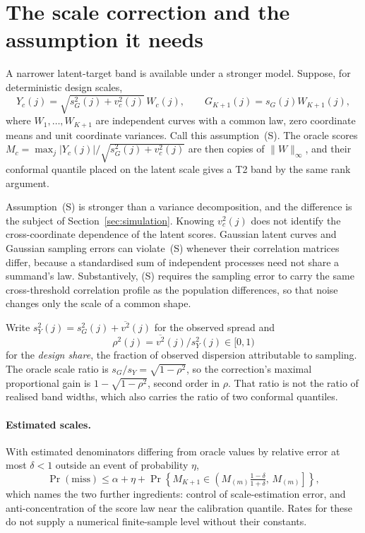 \section{The scale correction and the assumption it needs}\label{sec:correction}

A narrower latent-target band is available under a stronger model. Suppose,
for deterministic design scales,
\begin{equation}\label{eq:shape}
Y_c(j)=\sqrt{s_G^2(j)+v_c^2(j)}\,W_c(j),\qquad G_{K+1}(j)=s_G(j)W_{K+1}(j),
\end{equation}
where $W_1,\dots,W_{K+1}$ are independent curves with a common law, zero
coordinate means and unit coordinate variances. Call this assumption~(S). The
oracle scores $M_c=\max_j|Y_c(j)|/\sqrt{s_G^2(j)+v_c^2(j)}$ are then copies of
$\|W\|_\infty$, and their conformal quantile placed on the latent scale gives a
T2 band by the same rank argument.

Assumption~(S) is stronger than a variance decomposition, and the difference is
the subject of Section~\ref{sec:simulation}. Knowing $v_c^2(j)$ does not
identify the cross-coordinate dependence of the latent scores. Gaussian latent
curves and Gaussian sampling errors can violate~(S) whenever their correlation
matrices differ, because a standardised sum of independent processes need not
share a summand's law. Substantively, (S) requires the sampling error to carry
the same cross-threshold correlation profile as the population differences, so
that noise changes only the scale of a common shape.

Write $s_Y^2(j)=s_G^2(j)+\overline{v^2}(j)$ for the observed spread and
\begin{equation}\label{eq:rho}
\rho^2(j)=\overline{v^2}(j)\big/s_Y^2(j)\in[0,1)
\end{equation}
for the \emph{design share}, the fraction of observed dispersion attributable to
sampling. The oracle scale ratio is $s_G/s_Y=\sqrt{1-\rho^2}$, so the
correction's maximal proportional gain is $1-\sqrt{1-\rho^2}$, second order in
$\rho$. That ratio is not the ratio of realised band widths, which also carries
the ratio of two conformal quantiles.

\paragraph{Estimated scales.} With estimated denominators differing from oracle
values by relative error at most $\delta<1$ outside an event of probability
$\eta$,
\begin{equation}\label{eq:perturb}
\Pr(\mathrm{miss})\le\alpha+\eta+
\Pr\!\left\{M_{K+1}\in\left(M_{(m)}\tfrac{1-\delta}{1+\delta},\,M_{(m)}\right]\right\},
\end{equation}
which names the two further ingredients: control of scale-estimation error, and
anti-concentration of the score law near the calibration quantile. Rates for
these do not supply a numerical finite-sample level without their constants.
